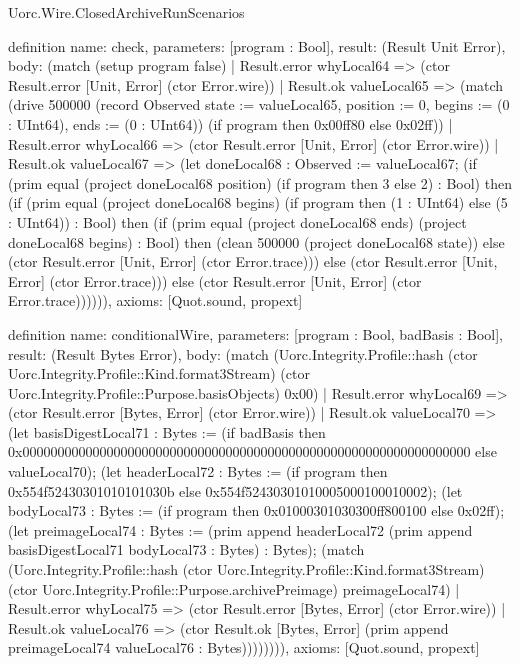 \begin{lexlean}{Uorc.Wire.ClosedArchiveRunScenarios}
\begin{semanticmodule}
definition{
  name: check,
  parameters: [program : Bool],
  result: (Result Unit Error),
  body: (match (setup program false)
    | Result.error whyLocal64 => (ctor Result.error [Unit, Error] (ctor Error.wire))
    | Result.ok valueLocal65 => (match (drive 500000 (record Observed {state := valueLocal65, position := 0, begins := (0 : UInt64), ends := (0 : UInt64)}) (if program then 0x00ff80 else 0x02ff))
      | Result.error whyLocal66 => (ctor Result.error [Unit, Error] (ctor Error.wire))
      | Result.ok valueLocal67 => (let doneLocal68 : Observed := valueLocal67; (if (prim equal (project doneLocal68 position) (if program then 3 else 2) : Bool) then (if (prim equal (project doneLocal68 begins) (if program then (1 : UInt64) else (5 : UInt64)) : Bool) then (if (prim equal (project doneLocal68 ends) (project doneLocal68 begins) : Bool) then (clean 500000 (project doneLocal68 state)) else (ctor Result.error [Unit, Error] (ctor Error.trace))) else (ctor Result.error [Unit, Error] (ctor Error.trace))) else (ctor Result.error [Unit, Error] (ctor Error.trace)))))),
  axioms: [Quot.sound, propext]
}

definition{
  name: conditionalWire,
  parameters: [program : Bool, badBasis : Bool],
  result: (Result Bytes Error),
  body: (match (Uorc.Integrity.Profile::hash (ctor Uorc.Integrity.Profile::Kind.format3Stream) (ctor Uorc.Integrity.Profile::Purpose.basisObjects) 0x00)
    | Result.error whyLocal69 => (ctor Result.error [Bytes, Error] (ctor Error.wire))
    | Result.ok valueLocal70 => (let basisDigestLocal71 : Bytes := (if badBasis then 0x0000000000000000000000000000000000000000000000000000000000000000 else valueLocal70); (let headerLocal72 : Bytes := (if program then 0x554f52430301010101030b else 0x554f52430301010005000100010002); (let bodyLocal73 : Bytes := (if program then 0x01000301030300ff800100 else 0x02ff); (let preimageLocal74 : Bytes := (prim append headerLocal72 (prim append basisDigestLocal71 bodyLocal73 : Bytes) : Bytes); (match (Uorc.Integrity.Profile::hash (ctor Uorc.Integrity.Profile::Kind.format3Stream) (ctor Uorc.Integrity.Profile::Purpose.archivePreimage) preimageLocal74)
      | Result.error whyLocal75 => (ctor Result.error [Bytes, Error] (ctor Error.wire))
      | Result.ok valueLocal76 => (ctor Result.ok [Bytes, Error] (prim append preimageLocal74 valueLocal76 : Bytes)))))))),
  axioms: [Quot.sound, propext]
}


\end{semanticmodule}
\end{lexlean}
